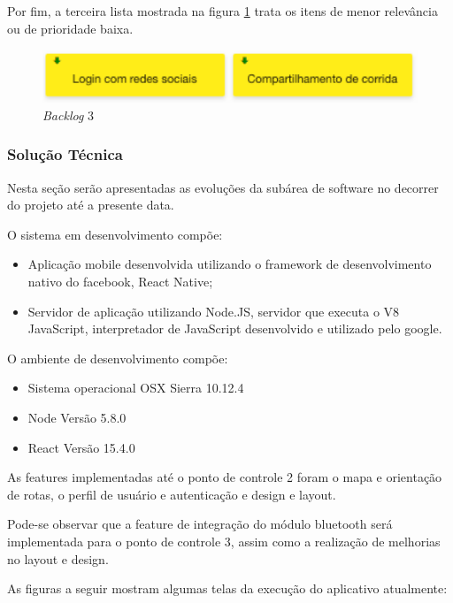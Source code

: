 Por fim, a terceira lista mostrada na figura \ref{img:figura3} trata os itens de menor relevância ou de prioridade baixa.

\graphicspath{{figuras/}}
\begin{figure}[!htb]
\centering
\includegraphics[scale=0.80]{figura3}
\caption{\textit{Backlog} 3}
\label{img:figura3}
\end{figure}

\subsubsection{Solução Técnica}
Nesta seção serão apresentadas as evoluções da subárea de software no decorrer do projeto até a presente data.

O sistema em desenvolvimento compõe:
\begin{itemize}
	\item Aplicação mobile desenvolvida utilizando o framework de desenvolvimento 
	nativo do facebook, React Native;
	\item Servidor de aplicação utilizando Node.JS, servidor que executa o V8 JavaScript,
	interpretador de JavaScript desenvolvido e utilizado pelo google. 
\end{itemize}

O ambiente de desenvolvimento compõe:
\begin{itemize}
	\item Sistema operacional OSX Sierra 10.12.4
	\item Node Versão 5.8.0
	\item React Versão 15.4.0
\end{itemize}

As features implementadas até o ponto de controle 2 foram o mapa e orientação de rotas, o perfil de usuário e autenticação e design e layout.

Pode-se observar que a feature de integração do módulo bluetooth será implementada para o ponto de controle 3, assim como a realização de melhorias no layout e design.

As figuras a seguir mostram algumas telas da execução do aplicativo atualmente:

